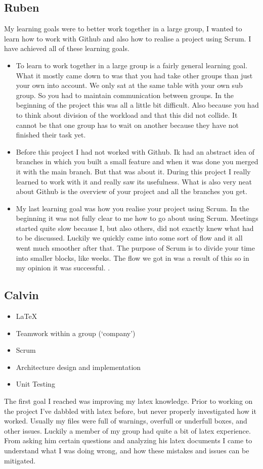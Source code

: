 \documentclass{article}
\begin{document}
\begin{enumerate}
\begin{itemize}
\subsection*{Ruben}
My learning goals were to better work together in a large group, I wanted to learn how to work with Github and also how to realise a project using Scrum. I have achieved all of these learning goals.
\begin{itemize}
	\item To learn to work together in a large group is a fairly general learning goal. What it mostly came down to was that you had take other groups than just your own into account. We only sat at the same table with your own sub group. So you had to maintain communication between groups. In the beginning of the project this was all a little bit difficult. Also because you had to think about division of the workload and that this did not collide. It cannot be that one group has to wait on another because they have not finished their task yet.
	\item Before this project I had not worked with Github. Ik had an abstract idea of branches in which you built a small feature and when it was done you merged it with the main branch. But that was about it. During this project I really learned to work with it and really saw its usefulness. What is also very neat about Github is the overview of your project and all the branches you get.
	\item My last learning goal was how you realise your project using Scrum. In the beginning it was not fully clear to me how to go about using Scrum. Meetings started quite slow because I, but also others, did not exactly knew what had to be discussed. Luckily we quickly came into some sort of flow and it all went much smoother after that. The purpose of Scrum is to divide your time into smaller blocks, like weeks. The flow we got in was a result of this so in my opinion it was successful.
.\end{itemize}

\subsection*{Calvin}
\begin{itemize}
 	\item \LaTeX
	\item Teamwork within a group (`company')
	\item Scrum
	\item Architecture design and  implementation
	\item Unit Testing
\end{itemize}
The first goal I reached was improving my latex knowledge. Prior to working on the project I've dabbled with latex before, but never properly investigated how it worked. Usually my files were full of warnings, overfull or underfull boxes, and other issues. Luckily a member of my group had quite a bit of latex experience. From asking him certain questions and analyzing his latex documents I came to understand what I was doing wrong, and how these mistakes and issues can be mitigated.


\end{itemize}
\end{enumerate}
\end{document}
